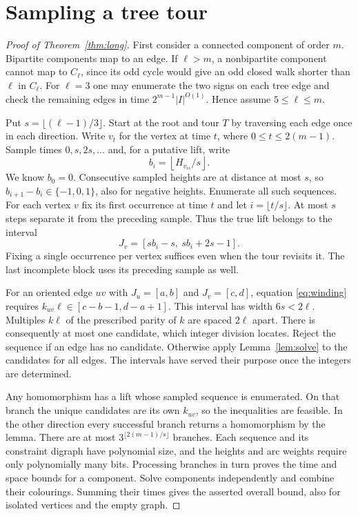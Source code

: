 \documentclass[11pt]{article}
\begin{document}
\section{Sampling a tree tour}
\begin{proof}[Proof of Theorem~\ref{thm:long}]
First consider a connected component of order $m$. Bipartite components
map to an edge. If $\ell>m$, a nonbipartite component cannot map to
$C_\ell$, since its odd cycle would give an odd closed walk shorter than
$\ell$ in $C_\ell$. For $\ell=3$ one may enumerate the two signs on each
tree edge and check the remaining edges in time $2^{m-1}|I|^{O(1)}$.
Hence assume $5\leq\ell\leq m$.

Put $s=\lfloor(\ell-1)/3\rfloor$. Start at the root and tour $T$ by
traversing each edge once in each direction. Write $v_t$ for the vertex
at time $t$, where $0\leq t\leq2(m-1)$. Sample times $0,s,2s,\ldots$
and, for a putative lift, write
\[
 b_i=\left\lfloor H_{v_{is}}/s\right\rfloor .
\]
We know $b_0=0$. Consecutive sampled heights are at distance at most $s$,
so $b_{i+1}-b_i\in\{-1,0,1\}$, also for negative heights.
Enumerate all such sequences. For each vertex $v$ fix its first occurrence
at time $t$ and let $i=\lfloor t/s\rfloor$. At most $s$ steps separate
it from the preceding sample. Thus the true lift belongs to the interval
\[
             J_v=[s b_i-s,\ s b_i+2s-1].
\]
Fixing a single occurrence per vertex suffices even when the tour
revisits it. The last incomplete block uses its preceding sample as well.

For an oriented edge $uv$ with $J_u=[a,b]$ and $J_v=[c,d]$, equation
\eqref{eq:winding} requires $k_{uv}\ell\in[c-b-1,d-a+1]$. This interval
has width $6s<2\ell$. Multiples $k\ell$ of the prescribed parity of $k$
are spaced $2\ell$ apart. There is consequently at most one candidate,
which integer division locates. Reject the sequence if an edge has no
candidate. Otherwise apply Lemma~\ref{lem:solve} to the candidates for
all edges. The intervals have served their purpose once the integers
are determined.

Any homomorphism has a lift whose sampled sequence is enumerated.
On that branch the unique candidates are its own $k_{uv}$, so the
inequalities are feasible. In the other direction every successful branch
returns a homomorphism by the lemma. There are at most
$3^{\lfloor2(m-1)/s\rfloor}$ branches. Each sequence and its constraint
digraph have polynomial size, and the heights and arc weights require
only polynomially many bits. Processing branches in turn proves the time
and space bounds for a component. Solve components independently and
combine their colourings. Summing their times gives the asserted overall
bound, also for isolated vertices and the empty graph.
\end{proof}
\end{document}
